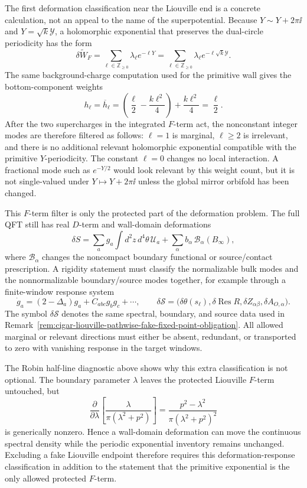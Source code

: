 \begin{construction}
\label{constr:cigar-liouville-asymptotic-deformation-filter}
The first deformation classification near the Liouville end is a concrete
calculation, not an appeal to the name of the superpotential.  Because
\(Y\sim Y+2\pi\ii\) and \(Y=\sqrt{k}\mathcal Y\), a holomorphic exponential
that preserves the dual-circle periodicity has the form
\[
  \delta\widetilde W_F
  =
  \sum_{\ell\in\mathbb Z_{\ge0}}\lambda_\ell e^{-\ell Y}
  =
  \sum_{\ell\in\mathbb Z_{\ge0}}\lambda_\ell
    e^{-\ell\sqrt{k}\mathcal Y}.
\]
The same background-charge computation used for the primitive wall gives the
bottom-component weights
\[
  h_\ell=\overline h_\ell
  =
  \left(\frac{\ell}{2}-\frac{k\ell^2}{4}\right)
  +
  \frac{k\ell^2}{4}
  =
  \frac{\ell}{2}.
\]
After the two supercharges in the integrated \(F\)-term act, the nonconstant
integer modes are therefore filtered as follows: \(\ell=1\) is marginal,
\(\ell\ge2\) is irrelevant, and there is no additional relevant holomorphic
exponential compatible with the primitive \(Y\)-periodicity.  The constant
\(\ell=0\) changes no local interaction.  A fractional mode such as
\(e^{-Y/2}\) would look relevant by this weight count, but it is not
single-valued under \(Y\mapsto Y+2\pi\ii\) unless the global mirror orbifold
has been changed.

This \(F\)-term filter is only the protected part of the deformation problem.
The full QFT still has real \(D\)-term and wall-domain deformations
\[
  \delta S
  =
  \sum_a g_a\int d^2z\,d^4\theta\,{\mathcal U}_a
  +
  \sum_\alpha b_\alpha\,{\mathcal B}_\alpha(B_\infty),
\]
where \({\mathcal B}_\alpha\) changes the noncompact boundary functional or
source/contact prescription.  A rigidity statement must classify the
normalizable bulk modes and the nonnormalizable boundary/source modes together,
for example through a finite-window response system
\[
  \dot g_a=(2-\Delta_a)g_a+C_{abc}g_bg_c+\cdots,\qquad
  \delta{\mathcal S}
  =
  \bigl(
    \delta\theta(s_\ell),
    \delta\operatorname*{Res}R,
    \delta Z_{\alpha\beta},
    \delta A_{O,\alpha}
  \bigr).
\]
The symbol \(\delta{\mathcal S}\) denotes the same spectral, boundary, and
source data used in
Remark~\ref{rem:cigar-liouville-pathwise-fake-fixed-point-obligation}.
All allowed marginal or relevant directions must either be absent, redundant,
or transported to zero with vanishing response in the target windows.

The Robin half-line diagnostic above shows why this extra classification is
not optional.  The boundary parameter \(\lambda\) leaves the protected
Liouville \(F\)-term untouched, but
\[
  \frac{\partial}{\partial\lambda}
  \left[
    \frac{\lambda}{\pi(\lambda^2+p^2)}
  \right]
  =
  \frac{p^2-\lambda^2}{\pi(\lambda^2+p^2)^2}
\]
is generically nonzero.  Hence a wall-domain deformation can move the
continuous spectral density while the periodic exponential inventory remains
unchanged.  Excluding a fake Liouville endpoint therefore requires this
deformation-response classification in addition to the statement that the
primitive exponential is the only allowed protected \(F\)-term.
\end{construction}

